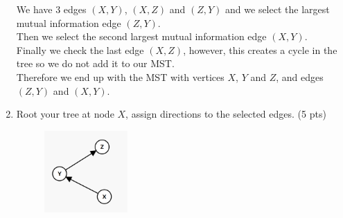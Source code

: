\documentclass[a4paper]{article}
\theoremstyle{definition}
\newenvironment{soln}{
	\leavevmode\color{blue}\ignorespaces
}{}
\begin{document}
\begin{enumerate}
        \begin{soln}
        We have 3 edges $(X,Y)$, $(X,Z)$ and $(Z,Y)$ and we select the largest mutual information edge $(Z,Y)$.\\
        Then we select the second largest mutual information edge $(X,Y)$. \\
        Finally we check the last edge $(X, Z)$, however, this creates a cycle in the tree so we do not add it to our MST. \\
        Therefore we end up with the MST with vertices $X$, $Y$ and $Z$, and edges $(Z,Y)$ and $(X,Y)$.
        \end{soln}
	\item Root your tree at node $X$, assign directions to the selected edges. (5 pts)
        \begin{figure}[H]
			\centering
			\includegraphics[width=0.3\textwidth]{images/q3_graph.png}
			\label{fig:gan_q1_loss}
		\end{figure}
\end{enumerate}

	
	
\end{document}
